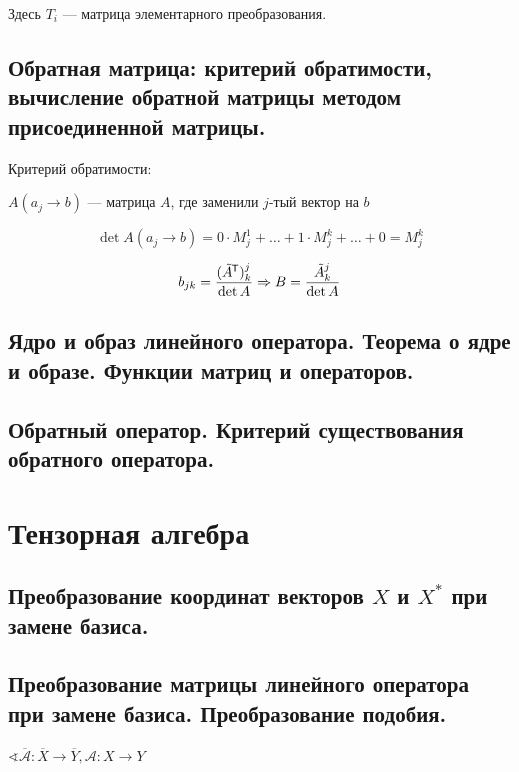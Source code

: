 
Здесь $T_i$ --- матрица элементарного преобразования.

\subsection{Обратная матрица: критерий обратимости, вычисление обратной матрицы методом присоединенной матрицы.}

Критерий обратимости: 


$A(a_j \to b)$ --- матрица $A$, где заменили $j$-тый вектор на $b$

$$\det A(a_j\to b) = 0 \cdot M_j^1 + \ldots + 1 \cdot M_j^k + \ldots + 0 = M^k_j$$

$$b_{jk} = \frac{(\tilde A^{\mkern-1.5mu\mathsf{T}} )^j_k}{\det A} \Rightarrow B = \frac{\tilde A_k^j}{\det A}$$

\subsection{Ядро и образ линейного оператора. Теорема о ядре и образе. Функции матриц и операторов.}

\subsection{Обратный оператор. Критерий существования обратного оператора.}

\section{Тензорная алгебра}

\subsection{Преобразование координат векторов $X$ и $X^*$ при замене базиса.}

\subsection{Преобразование матрицы линейного оператора при замене базиса. Преобразование подобия.}
$\sphericalangle \overline{\mathcal A} : \overline X \to \overline Y, \mathcal A : X \to Y$

